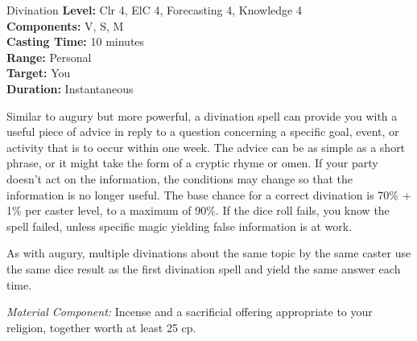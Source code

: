 {Divination}
{
	\textbf{Level:}
	Clr 4, ElC 4, Forecasting 4, Knowledge 4\\
	\textbf{Components:}
	V, S, M\\
	\textbf{Casting Time:}
	10 minutes\\
	\textbf{Range:}
	Personal\\
	\textbf{Target:}
	You\\
	\textbf{Duration:}
	Instantaneous\\
}
{
	Similar to augury but more powerful, a divination spell can provide you with a useful piece of advice in reply to a question concerning a specific goal, event, or activity that is to occur within one week. The advice can be as simple as a short phrase, or it might take the form of a cryptic rhyme or omen. If your party doesn't act on the information, the conditions may change so that the information is no longer useful. The base chance for a correct divination is 70\% + 1\% per caster level, to a maximum of 90\%. If the dice roll fails, you know the spell failed, unless specific magic yielding false information is at work.

	As with augury, multiple divinations about the same topic by the same caster use the same dice result as the first divination spell and yield the same answer each time.

	\textit{Material Component:}
	Incense and a sacrificial offering appropriate to your religion, together worth at least 25 cp.

}

